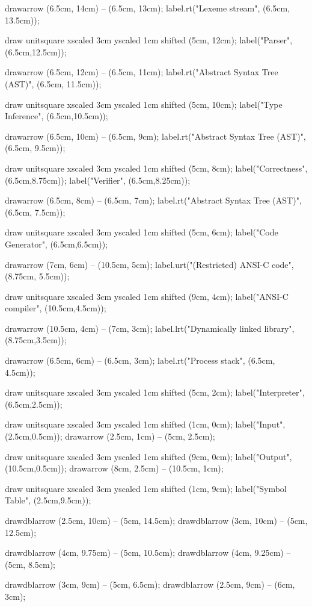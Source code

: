 drawarrow (6.5cm, 14cm) -- (6.5cm, 13cm);
label.rt("Lexeme stream", (6.5cm, 13.5cm));

draw unitsquare xscaled 3cm yscaled 1cm shifted (5cm, 12cm);
label("Parser", (6.5cm,12.5cm));

drawarrow (6.5cm, 12cm) -- (6.5cm, 11cm);
label.rt("Abstract Syntax Tree (AST)", (6.5cm, 11.5cm));

draw unitsquare xscaled 3cm yscaled 1cm shifted (5cm, 10cm);
label("Type Inference", (6.5cm,10.5cm));

drawarrow (6.5cm, 10cm) -- (6.5cm, 9cm);
label.rt("Abstract Syntax Tree (AST)", (6.5cm, 9.5cm));

draw unitsquare xscaled 3cm yscaled 1cm shifted (5cm, 8cm);
label("Correctness", (6.5cm,8.75cm));
label("Verifier", (6.5cm,8.25cm));

drawarrow (6.5cm, 8cm)  -- (6.5cm, 7cm);
label.rt("Abstract Syntax Tree (AST)", (6.5cm, 7.5cm));

draw unitsquare xscaled 3cm yscaled 1cm shifted (5cm, 6cm);
label("Code Generator", (6.5cm,6.5cm));

drawarrow (7cm, 6cm)    -- (10.5cm, 5cm);
label.urt("(Restricted) ANSI-C code", (8.75cm, 5.5cm));

draw unitsquare xscaled 3cm yscaled 1cm shifted (9cm, 4cm);
label("ANSI-C compiler", (10.5cm,4.5cm));

drawarrow (10.5cm, 4cm) -- (7cm, 3cm);
label.lrt("Dynamically linked library", (8.75cm,3.5cm));

drawarrow (6.5cm, 6cm)  -- (6.5cm, 3cm);
label.rt("Process stack", (6.5cm, 4.5cm));

draw unitsquare xscaled 3cm yscaled 1cm shifted (5cm, 2cm);
label("Interpreter", (6.5cm,2.5cm));

draw unitsquare xscaled 3cm yscaled 1cm shifted (1cm, 0cm);
label("Input", (2.5cm,0.5cm));
drawarrow (2.5cm, 1cm)  -- (5cm, 2.5cm);

draw unitsquare xscaled 3cm yscaled 1cm shifted (9cm, 0cm);
label("Output", (10.5cm,0.5cm));
drawarrow (8cm, 2.5cm)  -- (10.5cm, 1cm);

draw unitsquare xscaled 3cm yscaled 1cm shifted (1cm, 9cm);
label("Symbol Table", (2.5cm,9.5cm));

drawdblarrow (2.5cm, 10cm) -- (5cm, 14.5cm);
drawdblarrow (3cm, 10cm)   -- (5cm, 12.5cm);

drawdblarrow (4cm, 9.75cm) -- (5cm, 10.5cm);
drawdblarrow (4cm, 9.25cm) -- (5cm, 8.5cm);

drawdblarrow (3cm, 9cm)    -- (5cm, 6.5cm);
drawdblarrow (2.5cm, 9cm)  -- (6cm, 3cm);
\stopMPcode\egroup

